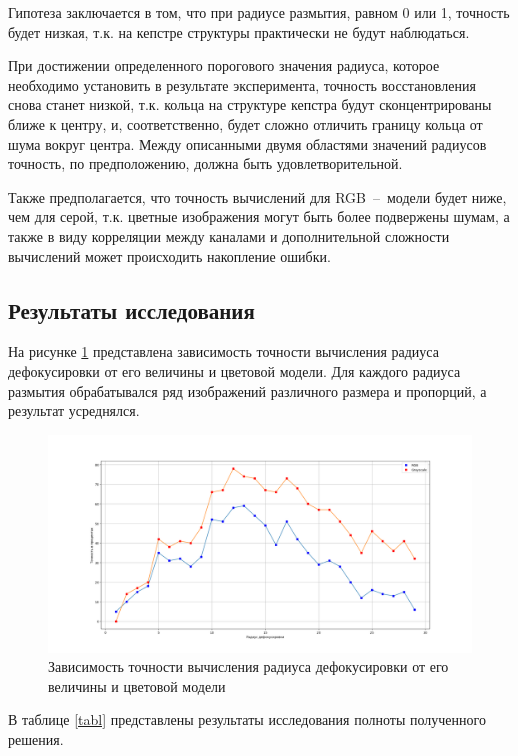 Гипотеза заключается в том, что при радиусе размытия, равном 0 или 1, точность будет низкая, т.к. на кепстре структуры практически не будут наблюдаться. 

При достижении определенного порогового значения радиуса, которое необходимо установить в результате эксперимента, точность восстановления снова станет низкой, т.к. кольца на структуре кепстра будут сконцентрированы ближе к центру, и, соответственно, будет сложно отличить границу кольца от шума вокруг центра. Между описанными двумя областями значений радиусов точность, по предположению, должна быть удовлетворительной. 

Также предполагается, что точность вычислений для RGB~--~модели будет ниже, чем для серой, т.к. цветные изображения могут быть более подвержены шумам, а также в виду корреляции между каналами и дополнительной сложности вычислений может происходить накопление ошибки.

\subsection*{Результаты исследования}

На рисунке \ref{full} представлена зависимость точности вычисления радиуса дефокусировки от его величины и цветовой модели. Для каждого радиуса размытия обрабатывался ряд изображений различного размера и пропорций, а результат усреднялся.

\begin{figure}[H]
	\centering
	\includegraphics[scale=0.35]{assets/exp_accuracy}
	\caption{Зависимость точности вычисления радиуса дефокусировки от его величины и цветовой модели}
	\label{full}
\end{figure}

В таблице \ref{tabl} представлены результаты исследования полноты полученного решения.

